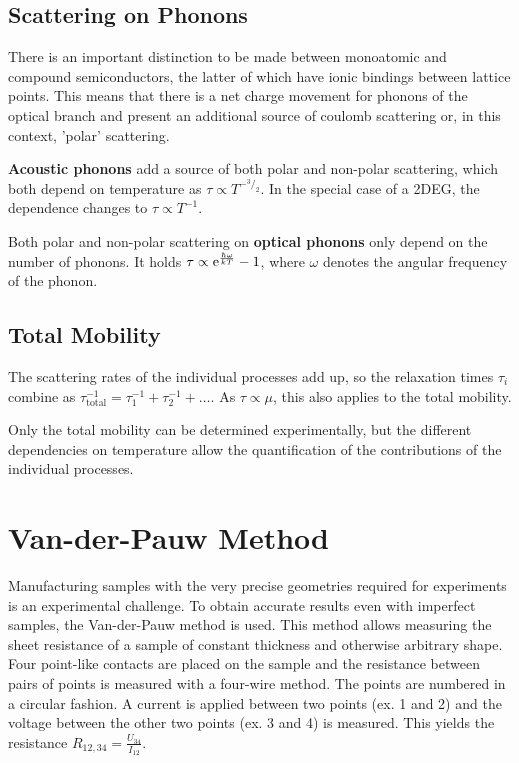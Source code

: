 \subsection{Scattering on Phonons}\label{subsec:phonons}
There is an important distinction to be made between monoatomic and compound semiconductors, the latter of which have ionic bindings between lattice points.
This means that there is a net charge movement for phonons of the optical branch and present an additional source of coulomb scattering or, in this context, 'polar' scattering.

\textbf{Acoustic phonons} add a source of both polar and non-polar scattering, which both depend on temperature as $\tau \propto T^{-{^3}/_2}$.
In the special case of a 2DEG, the dependence changes to $\tau \propto T^{-1}$.

Both polar and non-polar scattering on \textbf{optical phonons} only depend on the number of phonons.
It holds $\tau \propto \mathrm{e}^\frac{\hbar \omega}{k T} - 1$, where $\omega$ denotes the angular frequency of the phonon.

\subsection{Total Mobility}
The scattering rates of the individual processes add up, so the relaxation times $\tau_i$ combine as $\tau_\text{total}^{-1} = \tau_1^{-1} + \tau_2^{-1} + \dots$.
As $\tau \propto \mu$, this also applies to the total mobility.

Only the total mobility can be determined experimentally, but the different dependencies on temperature allow the quantification of the contributions of the individual processes.

\section{Van-der-Pauw Method}\label{sec:van-der-pauw-geometry}
Manufacturing samples with the very precise geometries required for experiments is an experimental challenge.
To obtain accurate results even with imperfect samples, the Van-der-Pauw method is used.
This method allows measuring the sheet resistance of a sample of constant thickness and otherwise arbitrary shape.
Four point-like contacts are placed on the sample and the resistance between pairs of points is measured with a four-wire method.
The points are numbered in a circular fashion.
A current is applied between two points (ex. 1 and 2) and the voltage between the other two points (ex. 3 and 4) is measured.
This yields the resistance $R_{12,34} = \frac{U_{34}}{I_{12}}$.

